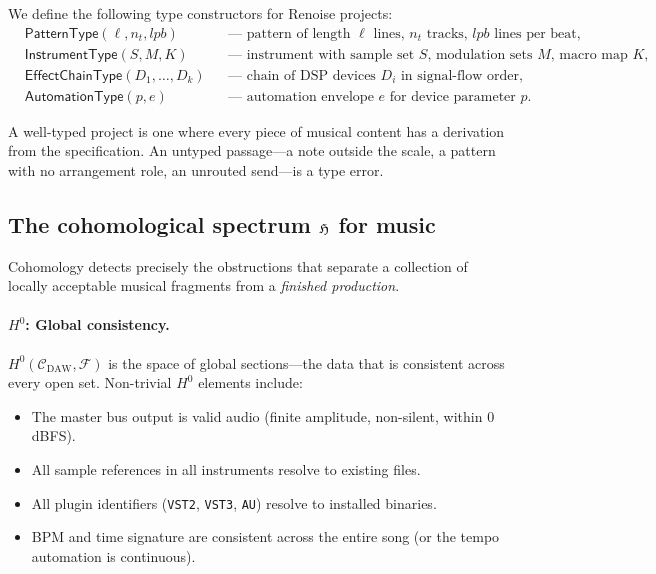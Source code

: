 \begin{definition}
\label{def:renoise-types}
We define the following type constructors for Renoise projects:
\begin{align*}
  &\mathsf{PatternType}(\ell, n_t, \mathit{lpb})
    &&\text{--- pattern of length $\ell$ lines, $n_t$ tracks,
           $\mathit{lpb}$ lines per beat,} \\
  &\mathsf{InstrumentType}(S, M, K)
    &&\text{--- instrument with sample set $S$, modulation sets $M$,
           macro map $K$,} \\
  &\mathsf{EffectChainType}(D_1, \ldots, D_k)
    &&\text{--- chain of DSP devices $D_i$ in signal-flow order,} \\
  &\mathsf{AutomationType}(p, e)
    &&\text{--- automation envelope $e$ for device parameter $p$.}
\end{align*}
\end{definition}

A well-typed project is one where every piece of musical content
has a derivation from the specification.  An untyped passage---a
note outside the scale, a pattern with no arrangement role, an
unrouted send---is a type error.

\subsection{The cohomological spectrum \texorpdfstring{$\mathfrak{H}$}{H}
  for music}
\label{ssec:musical-cohomology}

Cohomology detects precisely the obstructions that separate a
collection of locally acceptable musical fragments from a
\emph{finished production}.

\paragraph{$H^0$: Global consistency.}
$H^0(\mathcal{C}_{\mathrm{DAW}}, \mathcal{F})$ is the space of
global sections---the data that is consistent across every open set.
Non-trivial $H^0$ elements include:
\begin{itemize}
  \item The master bus output is valid audio (finite amplitude,
        non-silent, within 0\,dBFS).
  \item All sample references in all instruments resolve to
        existing files.
  \item All plugin identifiers (\texttt{VST2}, \texttt{VST3},
        \texttt{AU}) resolve to installed binaries.
  \item BPM and time signature are consistent across the entire
        song (or the tempo automation is continuous).
\end{itemize}

